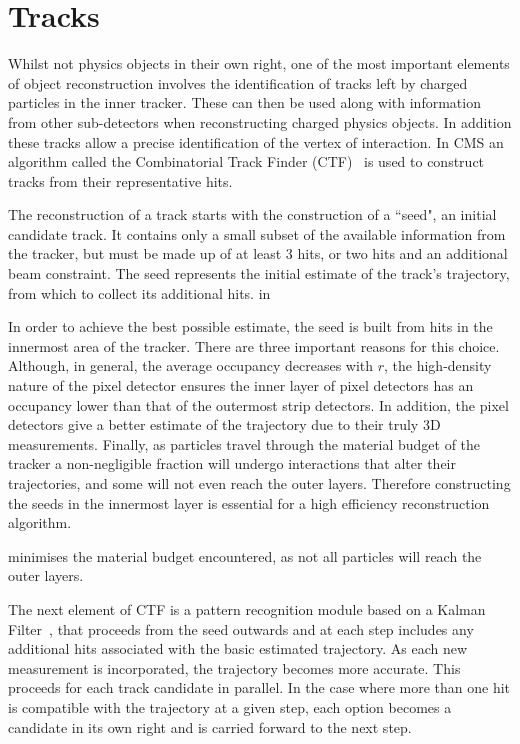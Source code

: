  
 
\section{Tracks}
\label{sec:trk}

Whilst not physics objects in their own right, one of the most important elements of object reconstruction involves the identification of tracks left by charged particles in the inner tracker. These can then be used along with information from other sub-detectors when reconstructing charged physics objects. In addition these tracks allow a precise identification of the vertex of interaction. In CMS an algorithm called the Combinatorial Track Finder (CTF)~\cite{CTF} is used to construct tracks from their representative hits. 

The reconstruction of a track starts with the construction of a ``seed", an initial candidate track. It contains only a small subset of the available information from the tracker, but must be made up of at least 3 hits, or two hits and an additional beam constraint. The seed represents the initial estimate of the track's trajectory, from which to collect its additional hits. in

In order to achieve the best possible estimate, the seed is built from hits in the innermost area of the tracker. There are three important reasons for this choice. Although, in general, the average occupancy decreases with $r$, the high-density nature of the pixel detector ensures the inner layer of pixel detectors has an occupancy lower than that of the outermost strip detectors. In addition, the pixel detectors give a better estimate of the trajectory due to their truly 3D measurements. Finally, as particles travel through the material budget of the tracker a non-negligible fraction will undergo interactions that alter their trajectories, and some will not even reach the outer layers. Therefore constructing the seeds in the innermost layer is essential for a high efficiency reconstruction algorithm.


 minimises the material budget encountered, as not all particles will reach the outer layers. 

The next element of CTF is a pattern recognition module based on a Kalman Filter~\cite{Kalman}, that proceeds from the seed outwards and at each step includes any additional hits associated with the basic estimated trajectory. As each new measurement is incorporated, the trajectory becomes more accurate. This proceeds for each track candidate in parallel. In the case where more than one hit is compatible with the trajectory at a given step, each option becomes a candidate in its own right and is carried forward to the next step.   

